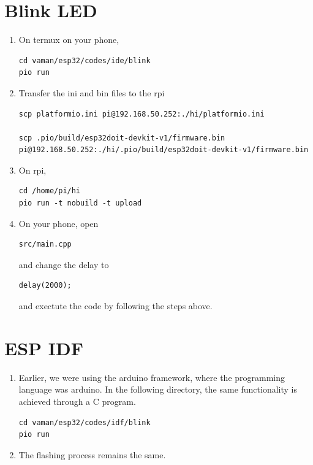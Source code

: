 \documentclass[journal,12pt,twocolumn]{IEEEtran}
\renewcommand\thesection{\arabic{section}}
\begin{document}
\section{Blink LED}
\renewcommand{\theequation}{\theenumi}
\renewcommand{\thefigure}{\theenumi}
\begin{enumerate}[label=\thesection.\arabic*.,ref=\thesection.\theenumi]
\item On termux on your phone, 
\begin{lstlisting}
cd vaman/esp32/codes/ide/blink
pio run
\end{lstlisting}
\item Transfer the ini and bin files to the rpi 
\begin{lstlisting}
scp platformio.ini pi@192.168.50.252:./hi/platformio.ini

scp .pio/build/esp32doit-devkit-v1/firmware.bin pi@192.168.50.252:./hi/.pio/build/esp32doit-devkit-v1/firmware.bin
\end{lstlisting}
\item On rpi,
\begin{lstlisting}
cd /home/pi/hi
pio run -t nobuild -t upload
\end{lstlisting}
\item On your phone, open 
\begin{lstlisting}
src/main.cpp 
\end{lstlisting}
and change the delay to 
\begin{lstlisting}
delay(2000);
\end{lstlisting}
and exectute the code by following the steps above.
\end{enumerate}

\section{ESP IDF}
\renewcommand{\theequation}{\theenumi}
\renewcommand{\thefigure}{\theenumi}
\begin{enumerate}[label=\thesection.\arabic*.,ref=\thesection.\theenumi]
\item Earlier, we were using the arduino framework, where the programming language was arduino.  In the following directory, the same functionality is achieved through a C program.
\begin{lstlisting}
cd vaman/esp32/codes/idf/blink
pio run
\end{lstlisting}
\item The flashing process remains the same.
\end{enumerate}
\end{document}

